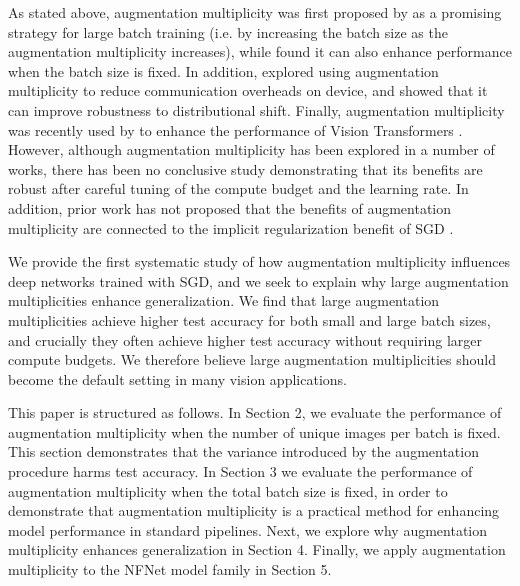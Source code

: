 \documentclass{article}
\begin{document}
As stated above, augmentation multiplicity was first proposed by \citet{hoffer2019augment} as a promising strategy for large batch training (i.e. by increasing the batch size as the augmentation multiplicity increases), while \citet{berman2019multigrain} found it can also enhance performance when the batch size is fixed. In addition, \citet{choi2019faster} explored using augmentation multiplicity to reduce communication overheads on device, and \citet{hendrycks2019augmix} showed that it can improve robustness to distributional shift. Finally, augmentation multiplicity was recently used by \citet{touvron2020training, touvron2021going} to enhance the performance of Vision Transformers \citep{dosovitskiy2020image}. However, although augmentation multiplicity has been explored in a number of works, there has been no conclusive study demonstrating that its benefits are robust after careful tuning of the compute budget and the learning rate. In addition, prior work has not proposed that the benefits of augmentation multiplicity are connected to the implicit regularization benefit of SGD \citep{keskar2016large, li2019towards, smith2021origin}.

We provide the first systematic study of how augmentation multiplicity influences deep networks trained with SGD, and we seek to explain why large augmentation multiplicities enhance generalization. We find that large augmentation multiplicities achieve higher test accuracy for both small and large batch sizes, and crucially they often achieve higher test accuracy without requiring larger compute budgets. We therefore believe large augmentation multiplicities should become the default setting in many vision applications. 

This paper is structured as follows. In Section 2, we evaluate the performance of augmentation multiplicity when the number of unique images per batch is fixed. This section demonstrates that the variance introduced by the augmentation procedure harms test accuracy. In Section 3 we evaluate the performance of augmentation multiplicity when the total batch size is fixed, in order to demonstrate that augmentation multiplicity is a practical method for enhancing model performance in standard pipelines. Next, we explore why augmentation multiplicity enhances generalization in Section 4. Finally, we apply augmentation multiplicity to the NFNet model family \citep{brock2021high} in Section 5.
\end{document}
